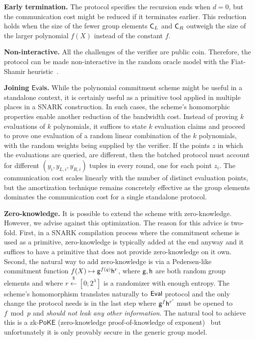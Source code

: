 \documentclass{article}
\theoremstyle{definition}
\begin{document}
\textbf{Early termination.} The protocol specifies the recursion ends when $d=0$, but the communication cost might be reduced if it terminates earlier. This reduction holds when the size of the fewer group elements $\mathsf{C}_L$ and $\mathsf{C}_R$ outweigh the size of the larger polynomial $f(X)$ instead of the constant $f$.

\textbf{Non-interactive.} All the challenges of the verifier are public coin. Therefore, the protocol can be made non-interactive in the random oracle model with the Fiat-Shamir heuristic~\cite{C:FiaSha86}.

\textbf{Joining $\mathsf{Eval}$s.} While the polynomial commitment scheme might be useful in a standalone context, it is certainly useful as a primitive tool applied in multiple places in a SNARK construction. In such cases, the scheme's homomorphic properties enable another reduction of the bandwidth cost. Instead of proving $k$ evaluations of $k$ polynomials, it suffices to state $k$ evaluation claims and proceed to prove one evaluation of a random linear combination of the $k$ polynomials, with the random weights being supplied by the verifier. If the points $z$ in which the evaluations are queried, are different, then the batched protocol must account for different $(y_i, y_{L,i}, y_{R,i})$ tuples in every round, one for each point $z_i$. The communication cost scales linearly with the number of distinct evaluation points, but the amortization technique remains concretely effective as the group elements dominates the communication cost for a single standalone protocol.

\textbf{Zero-knowledge.} It is possible to extend the scheme with zero-knowledge. However, we advise against this optimization. The reason for this advice is two-fold. First, in a SNARK compilation process where the commitment scheme is used as a primitive, zero-knowledge is typically added at the end anyway and it suffices to have a primitive that does not provide zero-knowledge on it own.
Second, the natural way to add zero-knowledge is via a Pedersen-like commitment function $f(X) \mapsto \mathsf{g}^{f(q)}\mathsf{h}^r$, where $\mathsf{g}, \mathsf{h}$ are both random group elements and where $r \xleftarrow{\$} [0; 2^\lambda]$ is a randomizer with enough entropy.
The scheme's homomorphism translates naturally to $\textsf{{Eval}}$ protocol and the only change the protocol needs is in the last step where $\mathsf{g}^f\mathsf{h}^{r'}$ must be opened to $f \bmod p$ and \emph{should not leak any other information}.
The natural tool to achieve this is a zk-$\mathsf{PoKE}$ (zero-knowledge proof-of-knowledge of exponent)~\cite[\S A.4]{C:BonBunFis19} but unfortunately it is only provably secure in the generic group model.
\end{document}

